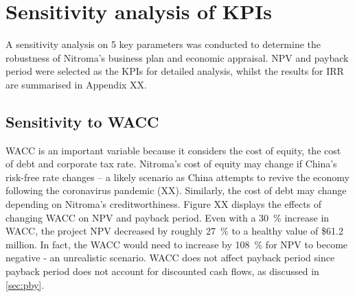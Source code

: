 \section{Sensitivity analysis of KPIs}
\label{sec:sensitivities-kpis}
A sensitivity analysis on 5 key parameters was conducted to determine the robustness of Nitroma’s business plan and economic appraisal. NPV and payback period were selected as the KPIs for detailed analysis, whilst the results for IRR are summarised in Appendix XX. 

\subsection{Sensitivity to WACC}
WACC is an important variable because it considers the cost of equity, the cost of debt and corporate tax rate. Nitroma’s cost of equity may change if China’s risk-free rate changes – a likely scenario as China attempts to revive the economy following the coronavirus pandemic (XX). Similarly, the cost of debt may change depending on Nitroma’s creditworthiness.  Figure XX displays the effects of changing WACC on NPV and payback period. Even with a \SI{30}{\percent} increase in WACC, the project NPV decreased by roughly \SI{27}{\percent} to a healthy value of \$61.2 million. In fact, the WACC would need to increase by \SI{108}{\percent} for NPV to become negative - an unrealistic scenario. WACC does not affect payback period since payback period does not account for discounted cash flows, as discussed in \cref{sec:pby}. 


